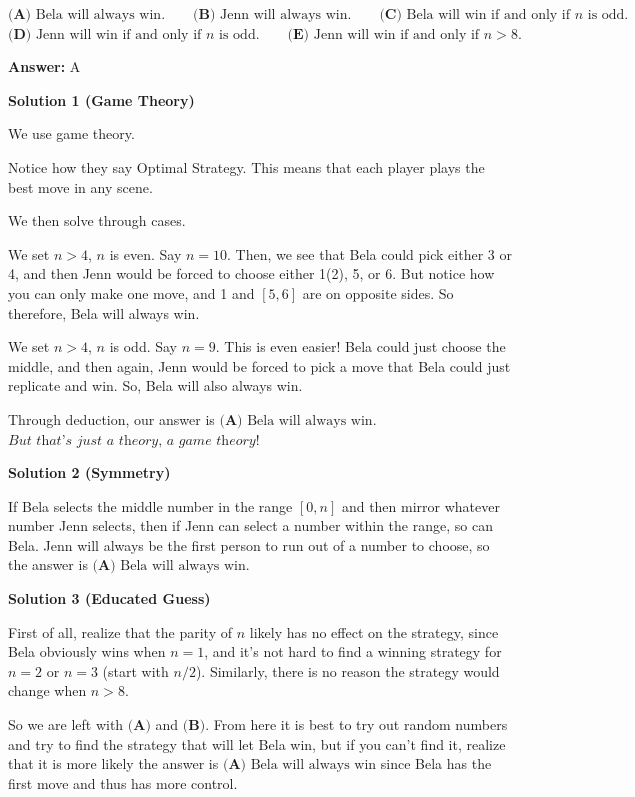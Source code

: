 \begin{enumerate}
 $\textbf{(A)} \text{ Bela will always win.} \qquad \textbf{(B)} \text{ Jenn will always win.} \qquad \textbf{(C)} \text{ Bela will win if and only if }n \text{ is odd.}$
$\textbf{(D)} \text{ Jenn will win if and only if }n \text{ is odd.} \qquad \textbf{(E)} \text { Jenn will win if and only if } n>8.$

 \textbf{Answer: }A



\textbf{Solution 1 (Game Theory)}

We use game theory.

 Notice how they say Optimal Strategy. This means that each player plays the best move in any scene.

 We then solve through cases.

 We set \( n > 4 \), \( n \) is even. Say \( n = 10 \). Then, we see that Bela could pick either 3 or 4, and then Jenn would be forced to choose either 1(2), 5, or 6. But notice how you can only make one move, and 1 and \( [5,6] \) are on opposite sides. So therefore, Bela will always win.

 We set \( n > 4 \), \( n \) is odd. Say \( n = 9 \). This is even easier! Bela could just choose the middle, and then again, Jenn would be forced to pick a move that Bela could just replicate and win. So, Bela will also always win.

 Through deduction, our answer is $\boxed{\textbf{(A)} \text{ Bela will always win.}}$
$\textit{But that's just a theory, a game theory!}$




\textbf{Solution 2 (Symmetry)}

If Bela selects the middle number in the range $[0, n]$ and then mirror whatever number Jenn selects, then if Jenn can select a number within the range, so can Bela. Jenn will always be the first person to run out of a number to choose, so the answer is $\boxed{\textbf{(A)} \text{ Bela will always win.}}$




\textbf{Solution 3 (Educated Guess)}

First of all, realize that the parity of $n$ likely has no effect on the strategy, since Bela obviously wins when $n=1$, and it's not hard to find a winning strategy for $n=2$ or $n=3$ (start with $n/2$).  Similarly, there is no reason the strategy would change when $n>8.$

 So we are left with $\textbf{(A)}$ and $\textbf{(B)}.$ From here it is best to try out random numbers and try to find the strategy that will let Bela win, but if you can't find it, realize that it is more likely the answer is $\boxed{\textbf{(A)} \text{ Bela will always win}}$ since Bela has the first move and thus has more control.


\end{enumerate}
